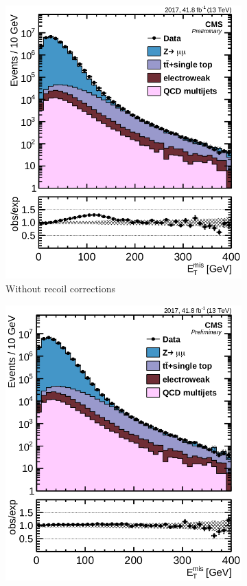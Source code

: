 \begin{figure}
\centering
\begin{subfigure}[b]{0.5\textwidth}
  \centering
  \includegraphics[width=\textwidth]{Images/withoutrecoil.png}
  \caption{\label{fig:recoil1} Without recoil corrections}
\end{subfigure}%
\begin{subfigure}[b]{0.5\textwidth}
  \centering
  \includegraphics[width=\textwidth]{Images/withrecoil.png}

\end{subfigure}
\end{figure}
